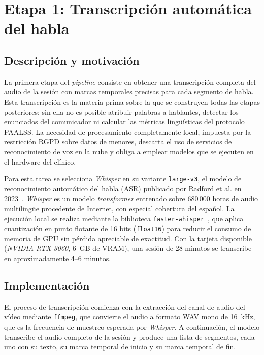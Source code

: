 \section{Etapa 1: Transcripción automática del habla}
\label{sec:etapa_asr}

\subsection{Descripción y motivación}
\label{subsec:asr_desc}

La primera etapa del \emph{pipeline} consiste en obtener una transcripción completa del
audio de la sesión con marcas temporales precisas para cada segmento de habla. Esta
transcripción es la materia prima sobre la que se construyen todas las etapas
posteriores: sin ella no es posible atribuir palabras a hablantes, detectar los
enunciados del comunicador ni calcular las métricas lingüísticas del protocolo
\ac{PAALSS}. La necesidad de procesamiento completamente local, impuesta por la
restricción \ac{RGPD} sobre datos de menores, descarta el uso de servicios de
reconocimiento de voz en la nube y obliga a emplear modelos que se ejecuten en el
hardware del clínico.

Para esta tarea se selecciona \emph{Whisper} en su variante \texttt{large-v3}, el
modelo de reconocimiento automático del habla (\ac{ASR}) publicado por Radford et al.
en 2023~\cite{whisper_radford2023}. \emph{Whisper} es un modelo \emph{transformer}
entrenado sobre 680\,000 horas de audio multilingüe procedente de Internet, con
especial cobertura del español. La ejecución local se realiza mediante la biblioteca
\texttt{faster-whisper}~\cite{whisper_radford2023}, que aplica cuantización en punto
flotante de 16 bits (\texttt{float16}) para reducir el consumo de memoria de \ac{GPU}
sin pérdida apreciable de exactitud. Con la tarjeta disponible (\emph{NVIDIA RTX 3060},
6~GB de VRAM), una sesión de 28 minutos se transcribe en aproximadamente 4--6 minutos.


\subsection{Implementación}
\label{subsec:asr_impl}

El proceso de transcripción comienza con la extracción del canal de audio del vídeo
mediante \texttt{ffmpeg}, que convierte el audio a formato WAV mono de 16~kHz, que es
la frecuencia de muestreo esperada por \emph{Whisper}. A continuación, el modelo
transcribe el audio completo de la sesión y produce una lista de segmentos, cada uno
con su texto, su marca temporal de inicio y su marca temporal de fin.

